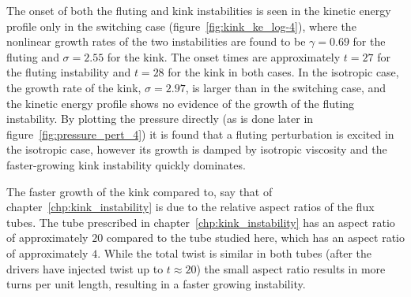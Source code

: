 The onset of both the fluting and kink instabilities is seen in the kinetic energy profile only in the switching case (figure~\ref{fig:kink_ke_log-4}), where the nonlinear growth rates of the two instabilities are found to be $\gamma = 0.69$ for the fluting and $\sigma = 2.55$ for the kink. The onset times are approximately $t=27$ for the fluting instability and $t=28$ for the kink in both cases. In the isotropic case, the growth rate of the kink, $\sigma = 2.97$, is larger than in the switching case, and the kinetic energy profile shows no evidence of the growth of the fluting instability. By plotting the pressure directly (as is done later in figure~\ref{fig:pressure_pert_4}) it is found that a fluting perturbation is excited in the isotropic case, however its growth is damped by isotropic viscosity and the faster-growing kink instability quickly dominates. 

The faster growth of the kink compared to, say that of chapter~\ref{chp:kink_instability} is due to the relative aspect ratios of the flux tubes. The tube prescribed in chapter~\ref{chp:kink_instability} has an aspect ratio of approximately $20$ compared to the tube studied here, which has an aspect ratio of approximately $4$. While the total twist is similar in both tubes (after the drivers have injected twist up to $t\approx20$) the small aspect ratio results in more turns per unit length, resulting in a faster growing instability.


